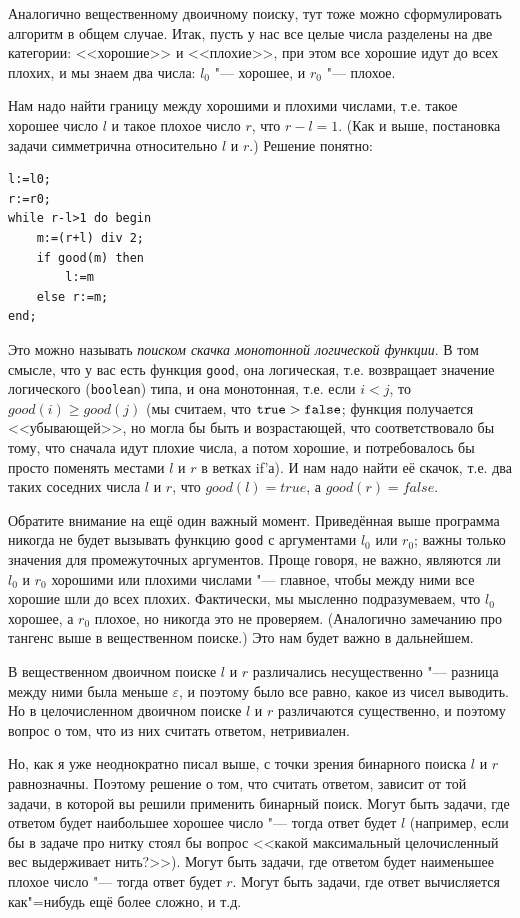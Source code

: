 \documentclass[a4paper,10pt]{problems}
\let\eps\varepsilon
\begin{document}
 Аналогично вещественному двоичному поиску, тут тоже можно сформулировать алгоритм в общем случае.
Итак, пусть у нас все целые числа разделены на две категории: <<хорошие>> и <<плохие>>, при этом все хорошие идут до всех плохих,
и мы знаем два числа: $l_0$ "--- хорошее, и $r_0$ "--- плохое. 

Нам надо найти границу между хорошими и плохими числами, т.е. такое хорошее число $l$ и такое плохое число $r$, что $r-l=1$. 
(Как и выше, постановка задачи симметрична относительно $l$ и $r$.)
Решение понятно:
\begin{codesampleo}\begin{verbatim}
l:=l0;
r:=r0;  
while r-l>1 do begin    
    m:=(r+l) div 2;
    if good(m) then
        l:=m
    else r:=m;
end;
\end{verbatim}
\end{codesampleo}

Это можно называть \textit{поиском скачка монотонной логической функции}. 
В том смысле, что у вас есть функция \verb`good`, она логическая, 
т.е. возвращает значение логического (\verb`boolean`) типа,
и она монотонная, т.е. если $i<j$, то $good(i)\geq good(j)$ 
(мы считаем, что $\verb`true`>\verb`false`$; функция получается <<убывающей>>,
но могла бы быть и возрастающей, что соответствовало бы тому,
что сначала идут плохие числа, а потом хорошие, и потребовалось бы просто поменять местами $l$ и $r$
в ветках if'а). 
И нам надо найти её скачок, т.е. два таких соседних числа $l$ и $r$, что $good(l)=true$,
а $good(r)=false$.

Обратите внимание на ещё один важный момент. 
Приведённая выше программа никогда не будет вызывать функцию \verb`good`
с аргументами $l_0$ или $r_0$; важны только значения для промежуточных аргументов.
Проще говоря, не важно, являются ли $l_0$ и $r_0$ хорошими или плохими числами
"--- главное, чтобы между ними все хорошие шли до всех плохих. 
Фактически, мы мысленно подразумеваем, что $l_0$ хорошее, а $r_0$ плохое, но
никогда это не проверяем.
(Аналогично замечанию про тангенс выше в вещественном поиске.)
Это нам будет важно в дальнейшем.

В вещественном двоичном поиске $l$ и $r$ различались несущественно "--- разница между ними
была меньше $\eps$, и поэтому было все равно, какое из чисел выводить. 
Но в целочисленном двоичном поиске $l$ и $r$ различаются существенно, и поэтому
вопрос о том, что из них считать ответом, нетривиален.

Но, как я уже неоднократно писал выше, с точки зрения бинарного поиска $l$ и $r$ равнозначны.
Поэтому решение о том, что считать ответом, зависит от той задачи, в которой
вы решили применить бинарный поиск. 
Могут быть задачи, где ответом будет наибольшее хорошее число "--- тогда ответ будет $l$
(например, если бы в задаче про нитку стоял бы вопрос <<какой максимальный целочисленный вес выдерживает нить?>>).
Могут быть задачи, где ответом будет наименьшее плохое число "--- тогда ответ будет $r$.
Могут быть задачи, где ответ вычисляется как"=нибудь ещё более сложно, и т.д.
\end{document}
